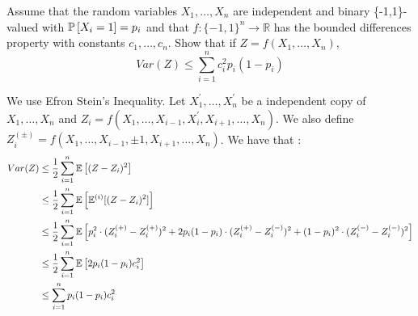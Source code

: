 \begin{exercise}[]{}
	Assume that the random variables $ X_1,\ldots,X_n $ are independent and binary \{-1,1\}-valued with $ \mathbb{P}\left[X_i =1\right]=p_i $ and that $ f : \{-1,1\}^n \rightarrow \mathbb{R}$ has the bounded differences property with constants $ c_1,\ldots,c_n $. Show that if $ Z=f(X_1,\ldots,X_n) $,
\begin{equation*}
	Var(Z) \leq \sum_{i=1}^{n}c_i^2p_i(1-p_i)
\end{equation*}

\end{exercise}

\begin{solution}[]
	We use Efron Stein's Inequality. Let $ X_1^{\prime},\ldots,X_n^{\prime}  $ be a independent copy of $ X_1,\ldots,X_n$ and $ Z_i = f(X_1,\ldots,X_{i-1},X^{\prime}_i,X_{i+1},\ldots,X_n) $. We also define $Z_i^{(\pm)} = f(X_1,\ldots,X_{i-1},\pm 1,X_{i+1},\ldots,X_n) $. We have that : 
\begin{align*}
	Var(Z) &\leq \frac{1}{2}\sum_{i=1}^{n}\mathbb{E}\left[(Z-Z_i)^2\right] \\
	       &\leq  \frac{1}{2}\sum_{i=1}^{n}\mathbb{E}\left[\mathbb{E}^{(i)}[(Z-Z_i)^2]\right]\\
	       &\leq \frac{1}{2}\sum_{i=1}^{n}\mathbb{E}\left[p_i^2\cdot (Z_i^{(+)}-Z_i^{(+)})^2 + 2p_i(1-p_i)\cdot (Z_i^{(+)}-Z_i^{(-)})^2 + (1-p_i)^2\cdot (Z_i^{(-)}-Z_i^{(-)})^2\right]\\
	       &\leq \frac{1}{2}\sum_{i=1}^{n}\mathbb{E}\left[2p_i(1-p_i)c_i^2\right]\\
	       &\leq \sum_{i=1}^{n}p_i(1-p_i)c_i^2 
\end{align*}
\end{solution}
